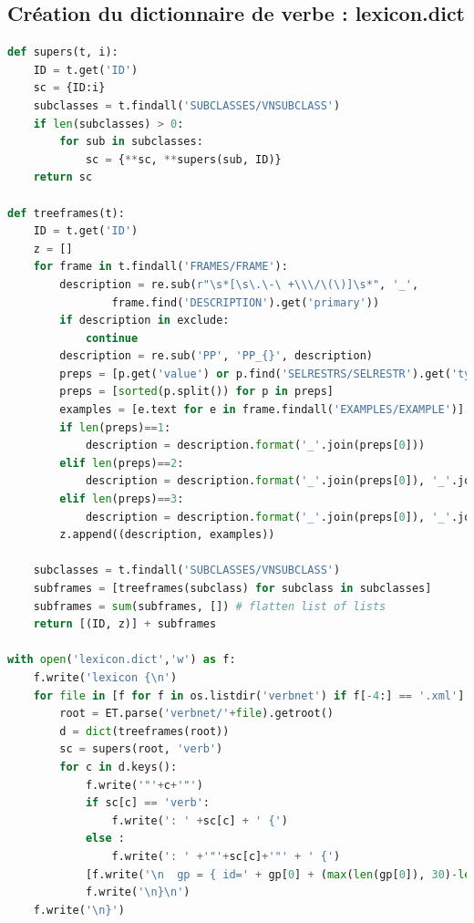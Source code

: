 \subsection{Création du dictionnaire de verbe : lexicon.dict}
\begin{lstlisting}[language=Python, caption = code pour lexicon.dict]
def supers(t, i):
    ID = t.get('ID')
    sc = {ID:i}
    subclasses = t.findall('SUBCLASSES/VNSUBCLASS')
    if len(subclasses) > 0:
        for sub in subclasses:
            sc = {**sc, **supers(sub, ID)}
    return sc

def treeframes(t):
    ID = t.get('ID')
    z = []
    for frame in t.findall('FRAMES/FRAME'):
        description = re.sub(r"\s*[\s\.\-\ +\\\/\(\)]\s*", '_', 
				frame.find('DESCRIPTION').get('primary'))
        if description in exclude:
            continue
        description = re.sub('PP', 'PP_{}', description)
        preps = [p.get('value') or p.find('SELRESTRS/SELRESTR').get('type').upper() for p in frame.findall('SYNTAX/PREP')+frame.findall('SYNTAX/LEX')]
        preps = [sorted(p.split()) for p in preps]     
        examples = [e.text for e in frame.findall('EXAMPLES/EXAMPLE')]
        if len(preps)==1:
            description = description.format('_'.join(preps[0]))
        elif len(preps)==2:
            description = description.format('_'.join(preps[0]), '_'.join(preps[1]))
        elif len(preps)==3:
            description = description.format('_'.join(preps[0]), '_'.join(preps[1]), '_'.join(preps[2]))
        z.append((description, examples))
        
    subclasses = t.findall('SUBCLASSES/VNSUBCLASS')
    subframes = [treeframes(subclass) for subclass in subclasses]
    subframes = sum(subframes, []) # flatten list of lists
    return [(ID, z)] + subframes

with open('lexicon.dict','w') as f:
    f.write('lexicon {\n')
    for file in [f for f in os.listdir('verbnet') if f[-4:] == '.xml']:
        root = ET.parse('verbnet/'+file).getroot()       
        d = dict(treeframes(root))
        sc = supers(root, 'verb')
        for c in d.keys():
            f.write('"'+c+'"')
            if sc[c] == 'verb':
                f.write(': ' +sc[c] + ' {')
            else :
                f.write(': ' +'"'+sc[c]+'"' + ' {')
            [f.write('\n  gp = { id=' + gp[0] + (max(len(gp[0]), 30)-len(gp[0]))*' ' + ' dia=x } // ' + ' '.join(gp[1])) for gp in d[c]]
            f.write('\n}\n')
    f.write('\n}')
\end{lstlisting}


